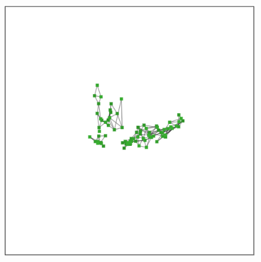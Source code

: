 \documentclass[
  12pt]{article}
\begin{document}
\begin{figure}[H]
\begin{minipage}[t]{0.33\linewidth}
{{\includegraphics{figures/pbmc3k/sc_2.png}

}

}

\subcaption{\label{fig-pbmc1_sc2}}
\end{minipage}%
%
\begin{minipage}[t]{0.33\linewidth}

{\centering 

}
\end{minipage}
\end{figure}
\end{document}
